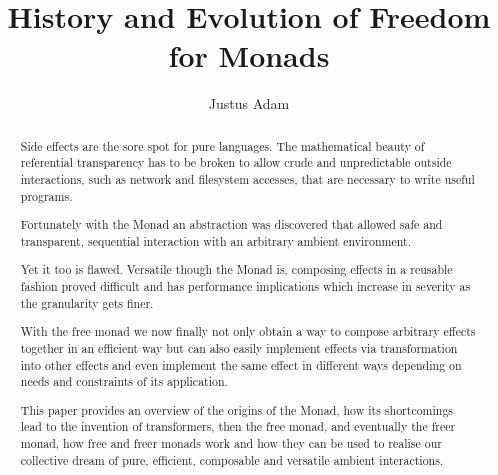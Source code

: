 \documentclass[sigconf]{acmart}
\begin{document}
\title{History and Evolution of Freedom for Monads}


\author{Justus Adam}
\affiliation{}


\begin{abstract}
Side effects are the sore spot for pure languages. The mathematical
beauty of referential transparency has to be broken to allow crude and
unpredictable outside interactions, such as network and filesystem
accesses, that are necessary to write useful programs.

Fortunately with the Monad an abstraction was discovered that allowed
safe and transparent, sequential interaction with an arbitrary ambient
environment.

Yet it too is flawed. Versatile though the Monad is, composing
effects in a reusable fashion proved difficult and has performance
implications which increase in severity as the granularity gets finer.

With the free monad we now finally not only obtain a way to compose
arbitrary effects together in an efficient way but can also easily
implement effects via transformation into other effects and even
implement the same effect in different ways depending on needs and
constraints of its application.

This paper provides an overview of the origins of the Monad, how its
shortcomings lead to the invention of transformers, then the free
monad, and eventually the freer monad, how free and freer monads work
and how they can be used to realise our collective dream of pure,
efficient, composable and versatile ambient interactions.
\end{abstract}

\maketitle







\end{document}
